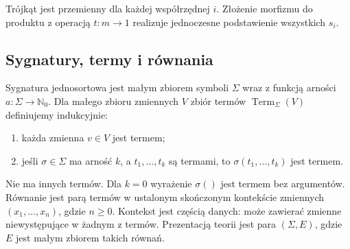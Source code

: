 \begin{center}
\end{center}
Trójkąt jest przemienny dla każdej współrzędnej $i$. Złożenie morfizmu do produktu z operacją $t:m\to1$ realizuje jednoczesne podstawienie wszystkich $s_i$.

\subsection{Sygnatury, termy i równania}

\begin{definicja}\label{cat:def:lawvere-signature}
Sygnatura jednosortowa jest małym zbiorem symboli $\Sigma$ wraz z funkcją arności $a:\Sigma\to\mathbb N_0$. Dla małego zbioru zmiennych $V$ zbiór termów $\operatorname{Term}_\Sigma(V)$ definiujemy indukcyjnie:
\begin{enumerate}
 \item każda zmienna $v\in V$ jest termem;
 \item jeśli $\sigma\in\Sigma$ ma arność $k$, a $t_1,\ldots,t_k$ są termami, to $\sigma(t_1,\ldots,t_k)$ jest termem.
\end{enumerate}
Nie ma innych termów. Dla $k=0$ wyrażenie $\sigma()$ jest termem bez argumentów. Równanie jest parą termów w ustalonym skończonym kontekście zmiennych $(x_1,\ldots,x_n)$, gdzie $n\geq0$. Kontekst jest częścią danych: może zawierać zmienne niewystępujące w żadnym z termów. Prezentacją teorii jest para $(\Sigma,E)$, gdzie $E$ jest małym zbiorem takich równań.
\end{definicja}


